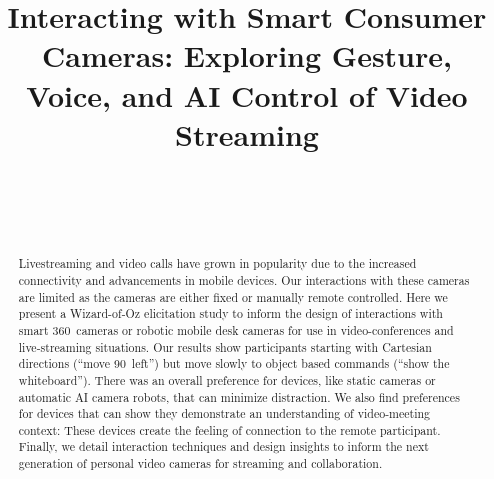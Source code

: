 \documentclass{tufte-handout}
\def\plaintitle{Interacting with Smart Consumer Cameras: Exploring
  Gesture, Voice, and AI Control of Video Streaming}
\begin{document}
\title{\plaintitle}

\author{%
  \\
  \\
  \\
}

\maketitle

\begin{abstract}
  Livestreaming and video calls have grown in popularity due to the
  increased connectivity and advancements in mobile devices. Our
  interactions with these cameras are limited as the cameras are
  either fixed or manually remote controlled.  Here we present a
  Wizard-of-Oz elicitation study to inform the design of interactions
  with smart 360\textdegree\ cameras or robotic mobile desk cameras
  for use in video-conferences and live-streaming situations.  Our
  results show participants starting with Cartesian directions (``move
  90\textdegree\ left'') but move slowly to object based commands
  (``show the whiteboard''). There was an overall preference for
  devices, like static cameras or automatic AI camera robots, that can
  minimize distraction. We also find preferences for devices that can
  show they demonstrate an understanding of video-meeting context:
  These devices create the feeling of connection to the remote
  participant.  Finally, we detail interaction techniques and design
  insights to inform the next generation of personal video cameras for
  streaming and collaboration.
\end{abstract}

\end{document}
